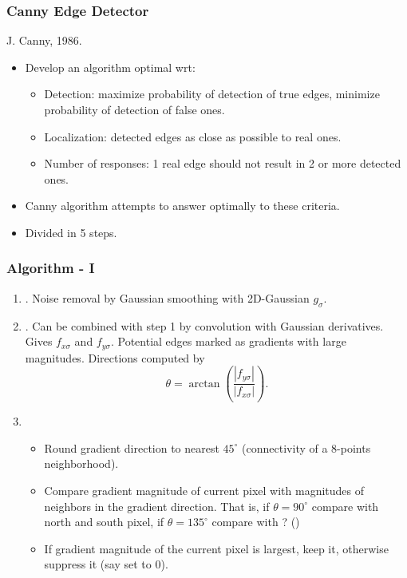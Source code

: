 \documentclass[9pt]{beamer}
\newcommand{\myemph}[1]{{\color{blue}{#1}}}
\begin{document}


\begin{frame}
  \frametitle{Canny Edge Detector}
  J. Canny, 1986.
  \begin{itemize}
  \item Develop an algorithm optimal wrt:
    \begin{itemize}
    \item Detection: maximize probability of detection of true edges, minimize probability of detection of false ones.\vfill
    \item Localization: detected edges as close as possible to real ones.\vfill
    \item Number of responses: 1 real edge should not result in 2 or
      more detected ones.\vfill
    \end{itemize}
  \item Canny algorithm attempts to answer optimally to these criteria.
  \item Divided in 5 steps.
  \end{itemize}
\end{frame}


\begin{frame}
  \frametitle{Algorithm - I}
  \begin{enumerate}
  \item \myemph{Smoothing}. Noise removal by Gaussian smoothing with 2D-Gaussian $g_\sigma$.
  \item \myemph{Gradient computation}. Can be combined with step 1 by
    convolution with Gaussian derivatives. Gives $f_{x\sigma}$ and
    $f_{y\sigma}$. Potential edges marked as gradients with large
    magnitudes. Directions computed by
    $$
    \theta = \arctan\left(\frac{|f_{y\sigma}|}{|f_{x\sigma}|}\right).
    $$
  \item \myemph{Non-maximum suppression.} 
    \begin{itemize}
    \item Round gradient direction to nearest $45^\circ$ (connectivity of a 8-points neighborhood).
    \item Compare gradient magnitude of current pixel with magnitudes
      of neighbors in the gradient direction. That is, if $\theta =
      90^\circ$ compare with north and south pixel, if $\theta =
      135^\circ$ compare with ? (\myemph{this is a question for you!}) 
    \item If gradient magnitude of the current pixel is largest, keep
      it, otherwise suppress it (say set to 0).
    \end{itemize}
  \end{enumerate}
\end{frame}
\end{document}
